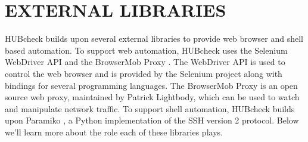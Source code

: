%
%
%



\chapter{EXTERNAL LIBRARIES}
\label{chap:external_libraries}

HUBcheck builds upon several external libraries to provide web browser and
shell based automation. To support web automation, HUBcheck uses the Selenium
WebDriver API \cite{SeleniumWebDriver:Online} and the BrowserMob Proxy
\cite{BrowserMOBProxy:Online}. The WebDriver API is used to control the web
browser and is provided by the Selenium project along with bindings for several
programming languages. The BrowserMob Proxy is an open source web proxy,
maintained by Patrick Lightbody, which can be used to watch and manipulate
network traffic. To support shell automation, HUBcheck builds upon Paramiko
\cite{Paramiko:Online}, a Python implementation of the SSH version 2 protocol.
Below we'll learn more about the role each of these libraries plays.

